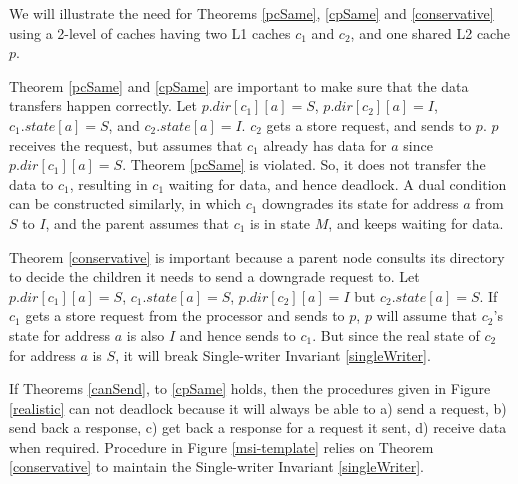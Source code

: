 We will illustrate the need for Theorems \ref{pcSame}, \ref{cpSame} and
\ref{conservative} using a 2-level of caches having two L1 caches $c_1$ and
$c_2$, and one shared L2 cache $p$.

Theorem \ref{pcSame} and \ref{cpSame} are important to make sure that the data
transfers happen correctly. Let $p.dir[c_1][a] = S$, $p.dir[c_2][a] = I$,
$c_1.state[a] = S$, and $c_2.state[a] = I$. $c_2$ gets a store request, and
sends  to $p$. $p$ receives the request, but assumes that
$c_1$ already has data for $a$ since $p.dir[c_1][a] = S$. Theorem \ref{pcSame}
is violated. So, it does not transfer the data to $c_1$, resulting in $c_1$
waiting for data, and hence deadlock. A dual condition can be constructed
similarly, in which $c_1$ downgrades its state for address $a$ from $S$ to $I$,
and the parent assumes that $c_1$ is in state $M$, and keeps waiting for data.

Theorem \ref{conservative} is important because a parent node consults its
directory to decide the children it needs to send a downgrade request to.  Let
$p.dir[c_1][a] = S$, $c_1.state[a] = S$, $p.dir[c_2][a] = I$ but
$c_2.state[a] = S$. If $c_1$ gets a store request from the processor and sends
 to $p$, $p$ will assume that $c_2$'s state for address $a$
is also $I$ and hence sends  to $c_1$. But since the real
state of  $c_2$ for address $a$ is $S$, it will break Single-writer Invariant
\ref{singleWriter}.

If Theorems \ref{canSend}, to \ref{cpSame} holds, then the procedures given in
Figure \ref{realistic} can not deadlock because it will always be able to a)
send a request, b) send back a response, c) get back a response for a request it
sent, d) receive data when required. Procedure \uReq{} in Figure
\ref{msi-template} relies on Theorem \ref{conservative} to maintain the
Single-writer Invariant \ref{singleWriter}.
